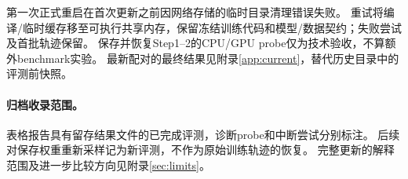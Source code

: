 第一次正式重启在首次更新之前因网络存储的临时目录清理错误失败。
重试将编译/临时缓存移至可执行共享内存，保留冻结训练代码和模型/数据契约；失败尝试及首批轨迹保留。
保存并恢复Step1--2的CPU/GPU probe仅为技术验收，不算额外benchmark实验。
最新配对的最终结果见附录\ref{app:current}，替代历史目录中的评测前快照。

\paragraph{归档收录范围。}
表格报告具有留存结果文件的已完成评测，诊断probe和中断尝试分别标注。
后续对保存权重重新采样记为新评测，不作为原始训练轨迹的恢复。
完整更新的解释范围及进一步比较方向见附录\ref{sec:limits}。
